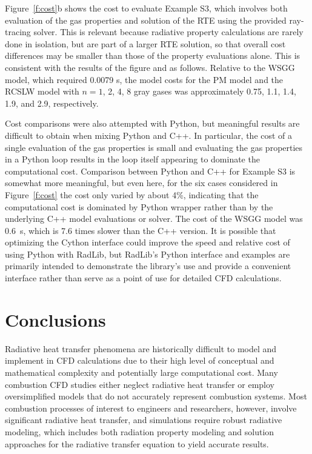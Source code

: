 \documentclass[preprint,12pt]{elsarticle}
\begin{document}
Figure~\ref{f:cost}b shows the cost to evaluate Example S3, which involves both evaluation of the gas properties and solution of the RTE using the provided ray-tracing solver. This is relevant because radiative property calculations are rarely done in isolation, but are part of a larger RTE solution, so that overall cost differences may be smaller than those of the property evaluations alone. This is consistent with the results of the figure and as follows. Relative to the WSGG model, which required 0.0079 s, the model costs for the PM model and the RCSLW model with $n=1$, 2, 4, 8 gray gases was approximately 0.75, 1.1, 1.4, 1.9, and 2.9, respectively. 

Cost comparisons were also attempted with Python, but meaningful results are difficult to obtain when mixing Python and C++. In particular, the cost of a single evaluation of the gas properties is small and evaluating the gas properties in a Python loop results in the loop itself appearing to dominate the computational cost. Comparison between Python and C++ for Example S3 is somewhat more meaningful, but even here, for the six cases considered in Figure~\ref{f:cost} the cost only varied by about 4\%, indicating that the computational cost is dominated by Python wrapper rather than by the underlying C++ model evaluations or solver. The cost of the WSGG model was 0.6~s, which is 7.6 times slower than the C++ version. It is possible that optimizing the Cython interface could improve the speed and relative cost of using Python with RadLib, but RadLib's Python interface and examples are primarily intended to demonstrate the library's use and provide a convenient interface rather than serve as a point of use for detailed CFD calculations.


\section{Conclusions} \label{s:conclusions}

Radiative heat transfer phenomena are historically difficult to model and implement in CFD calculations due to their high level of conceptual and mathematical complexity and potentially large computational cost. Many combustion CFD studies either neglect radiative heat transfer or employ oversimplified models that do not accurately represent combustion systems. Most combustion processes of interest to engineers and researchers, however, involve significant radiative heat transfer, and simulations require robust radiative modeling, which includes both radiation property modeling and solution approaches for the radiative transfer equation to yield accurate results. 
\end{document}
